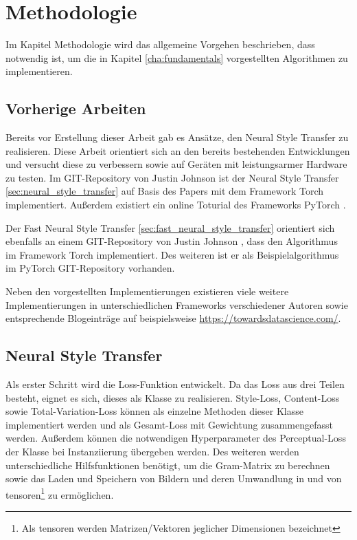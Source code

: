 \chapter{Methodologie}
\label{cha:methodology}

Im Kapitel Methodologie wird das allgemeine Vorgehen beschrieben, dass notwendig ist, um die in Kapitel \ref{cha:fundamentals} vorgestellten Algorithmen zu implementieren.

\section{Vorherige Arbeiten}

Bereits vor Erstellung dieser Arbeit gab es Ansätze, den Neural Style Transfer zu realisieren. Diese Arbeit orientiert sich an den bereits bestehenden Entwicklungen und versucht diese zu verbessern sowie auf Geräten mit leistungsarmer Hardware zu testen. Im GIT-Repository von Justin Johnson \cite{Johnson2015} ist der Neural Style Transfer \ref{sec:neural_style_transfer} auf Basis des Papers \cite{DBLP:journals/corr/GatysEB15a} mit dem Framework Torch \cite{torch} implementiert. Außerdem existiert ein online Toturial des Frameworks PyTorch \cite{OnlineToturialNeuralStylePyTorch}.

Der Fast Neural Style Transfer \ref{sec:fast_neural_style_transfer} orientiert sich ebenfalls an einem GIT-Repository von Justin Johnson \cite{Johnson2016}, dass den Algorithmus im Framework Torch implementiert. Des weiteren ist er als Beispielalgorithmus im PyTorch GIT-Repository \cite{PyTorchFastNeuralStyle} vorhanden.

Neben den vorgestellten Implementierungen existieren viele weitere Implementierungen in unterschiedlichen Frameworks verschiedener Autoren sowie entsprechende Blogeinträge auf beispielsweise \url{https://towardsdatascience.com/}.

\pagebreak

\section{Neural Style Transfer}
\label{sec:method_neural_style_transfer}

Als erster Schritt wird die Loss-Funktion entwickelt. Da das Loss aus drei Teilen besteht, eignet es sich, dieses als Klasse zu realisieren. Style-Loss, Content-Loss sowie Total-Variation-Loss können als einzelne Methoden dieser Klasse implementiert werden und als Gesamt-Loss mit Gewichtung zusammengefasst werden. Außerdem können die notwendigen Hyperparameter des Perceptual-Loss der Klasse bei Instanziierung übergeben werden. Des weiteren werden unterschiedliche Hilfsfunktionen benötigt, um die Gram-Matrix zu berechnen sowie das Laden und Speichern von Bildern und deren Umwandlung in und von \gls{tensor}en\footnote{Als \gls{tensor}en werden Matrizen/Vektoren jeglicher Dimensionen bezeichnet} zu ermöglichen.

